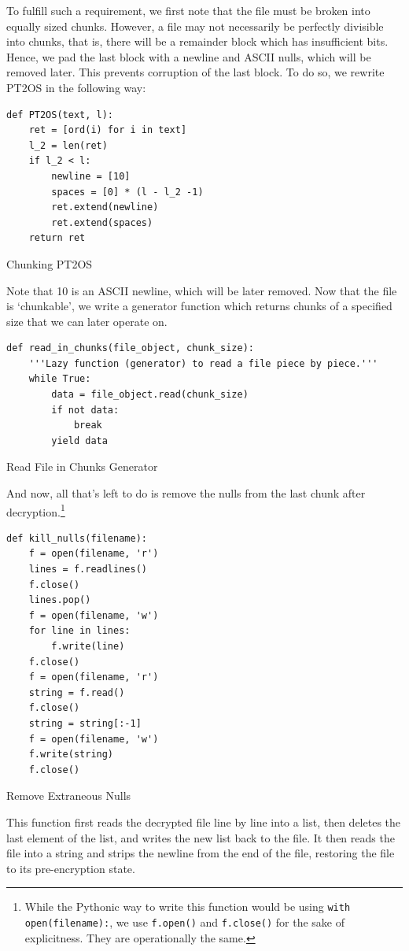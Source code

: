 \documentclass[titlepage]{article}
\newenvironment{longlisting}{\captionsetup{type=listing}}{}
\begin{document}
To fulfill such a requirement, we first note that the file must be broken into equally sized chunks.
However, a file may not necessarily be perfectly divisible into chunks, that is, there will be a
remainder block which has insufficient bits. Hence, we pad the last block with a newline and ASCII
nulls, which will be removed later. This prevents corruption of the last block. To do so, we rewrite
PT2OS in the following way:
\begin{longlisting}
\begin{verbatim}
def PT2OS(text, l):
    ret = [ord(i) for i in text]
    l_2 = len(ret)
    if l_2 < l:
        newline = [10]
        spaces = [0] * (l - l_2 -1)
        ret.extend(newline)
        ret.extend(spaces)
    return ret
\end{verbatim}
\caption{Chunking PT2OS}
\end{longlisting}
Note that 10 is an ASCII newline, which will be later removed. Now that the file is `chunkable', we
write a generator function which returns chunks of a specified size that we can later operate on.
\begin{longlisting}
\begin{verbatim}
def read_in_chunks(file_object, chunk_size):
    '''Lazy function (generator) to read a file piece by piece.'''
    while True:
        data = file_object.read(chunk_size)
        if not data:
            break
        yield data
\end{verbatim}
\caption{Read File in Chunks Generator}
\end{longlisting}
And now, all that's left to do is remove the nulls from the last chunk after
decryption.\footnote{While the Pythonic way to write this function would be using \texttt{with
open(filename):}, we use \texttt{f.open()} and \texttt{f.close()} for the sake of explicitness. They
are operationally the same.}
\begin{longlisting}
\begin{verbatim}
def kill_nulls(filename):
    f = open(filename, 'r')
    lines = f.readlines()
    f.close()
    lines.pop()
    f = open(filename, 'w')
    for line in lines:
        f.write(line)
    f.close()
    f = open(filename, 'r')
    string = f.read()
    f.close()
    string = string[:-1]
    f = open(filename, 'w')
    f.write(string)
    f.close()
\end{verbatim}
\caption{Remove Extraneous Nulls}
\end{longlisting}
This function first reads the decrypted file line by line into a list, then deletes the last element
of the list, and writes the new list back to the file. It then reads the file into a string and
strips the newline from the end of the file, restoring the file to its pre-encryption state.
\end{document}
